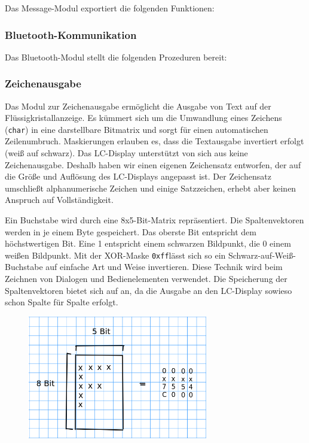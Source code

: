 \documentclass[ngerman]{article}
\begin{document}
Das Message-Modul exportiert die folgenden Funktionen:




\subsubsection{Bluetooth-Kommunikation}

Das Bluetooth-Modul stellt die folgenden Prozeduren bereit:



\subsubsection{Zeichenausgabe}

Das Modul zur Zeichenausgabe ermöglicht die Ausgabe von Text auf
der Flüs\-sig\-kris\-tall\-an\-zei\-ge. Es kümmert sich um die Umwandlung
eines Zeichens ({\tt char}) in eine darstellbare Bitmatrix und sorgt für
einen automatischen Zeilenumbruch. Maskierungen erlauben es, dass die
Textausgabe invertiert erfolgt (weiß auf schwarz). Das LC-Display 
unterstützt von sich aus keine Zeichenausgabe. Deshalb haben wir einen
eigenen Zeichensatz entworfen, der auf die Größe und Auflösung des 
LC-Displays angepasst ist. Der Zeichensatz umschließt alphanumerische
Zeichen und einige Satzzeichen, erhebt aber keinen Anspruch auf
Vollständigkeit.

Ein Buchstabe wird durch eine 8x5-Bit-Matrix repräsentiert. Die
Spaltenvektoren werden in je einem Byte gespeichert. Das oberste Bit
entspricht dem höchstwertigen Bit. Eine 1 entspricht einem schwarzen
Bildpunkt, die 0 einem weißen Bildpunkt. Mit der XOR-Maske {\tt 0xff}lässt
sich so ein Schwarz-auf-Weiß-Buchstabe auf einfache Art und Weise
invertieren. Diese Technik wird beim Zeichnen von Dialogen und Bedienelementen 
verwendet. Die Speicherung der Spaltenvektoren bietet sich auf an,
da die Ausgabe an den LC-Display sowieso schon Spalte für Spalte erfolgt.

\begin{figure}[h!] \begin{center}
    \includegraphics[width=0.7\textwidth]{media/char}
\end{center} \end{figure}
\end{document}
